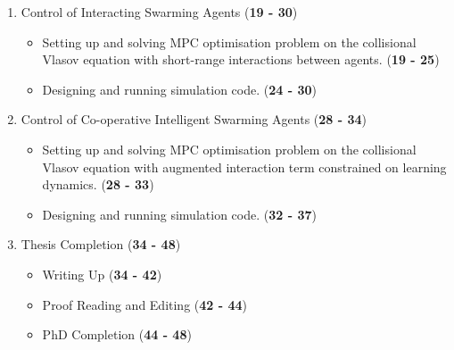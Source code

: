 \documentclass[.../main.tex]{subfiles}
\begin{document}
\begin{enumerate}
		\item Control of Interacting Swarming Agents (\textbf{19 - 30})
		\begin{itemize}
			\item Setting up and solving MPC optimisation problem on the collisional Vlasov
			equation with short-range interactions between agents. (\textbf{19 - 25})
			\item Designing and running simulation code. (\textbf{24 - 30})
		\end{itemize}

		\item Control of Co-operative Intelligent Swarming Agents (\textbf{28 - 34})
		\begin{itemize}
			\item Setting up and solving MPC optimisation problem on the collisional Vlasov
			equation with augmented interaction term constrained on learning dynamics. (\textbf{28 -
			33})
			\item Designing and running simulation code. (\textbf{32 - 37})
		\end{itemize}



		\item Thesis Completion (\textbf{34 - 48})
		\begin{itemize}
			\item Writing Up (\textbf{34 - 42})
			\item Proof Reading and Editing (\textbf{42 - 44})
			\item PhD Completion (\textbf{44 - 48})
		\end{itemize}

	\end{enumerate}
\end{document}
